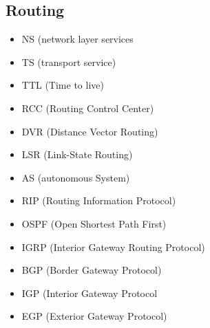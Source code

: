 	\subsection{Routing}
		\begin{itemize}
			\item NS (network layer services
			\item TS (transport service)
			\item TTL (Time to live)
			\item RCC (Routing Control Center)
			\item DVR (Distance Vector Routing)
			\item LSR (Link-State Routing)
			\item AS (autonomous System)
			\item RIP (Routing Information Protocol)
			\item OSPF (Open Shortest Path First)
			\item IGRP (Interior Gateway Routing Protocol)
			\item BGP (Border Gateway Protocol)
			\item IGP (Interior Gateway Protocol
			\item EGP (Exterior Gateway Protocol)
		\end{itemize}